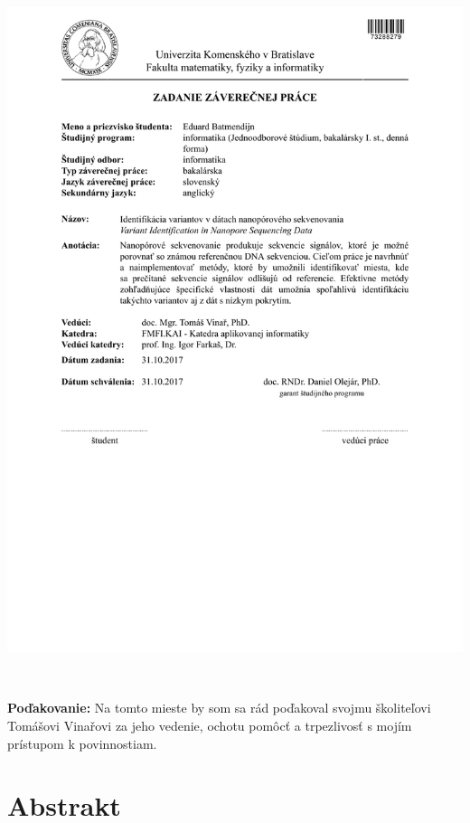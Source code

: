 \documentclass[12pt, oneside]{book}
\theoremstyle{definition}
\theoremstyle{remark}
\begin{document}
\newpage 
\thispagestyle{empty}
\hspace{-2cm}\includegraphics[width=1.1\textwidth]{images/zadanie}



\setcounter{page}{3}
\newpage 
~

\vfill
{\bf Poďakovanie:} Na tomto mieste by som sa rád poďakoval
svojmu školiteľovi Tomášovi Vinařovi za jeho vedenie, ochotu pomôcť a
trpezlivosť s mojím prístupom k povinnostiam.


\newpage 
\section*{Abstrakt}
\end{document}
